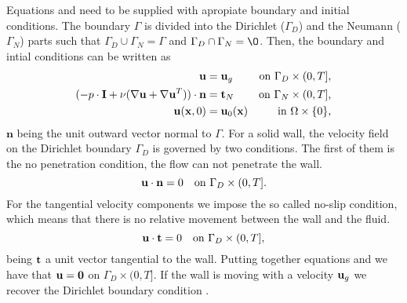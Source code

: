 Equations  and  need to be supplied with apropiate boundary and initial conditions. The boundary $\Gamma$ is divided into the Dirichlet ($\Gamma_D$) and the Neumann ($\Gamma_N$) parts such that $\Gamma_D\cup\Gamma_N=\Gamma$ and $\Gamma_D\cap\Gamma_N=\O$. Then, the boundary and intial conditions can be written as
\begin{align}
\label{eq-NS_strong_Dir}
{\bf u}&={\bf u}_g&\mbox{on $\Gamma_D\times(0,T]$,}\\
\label{eq-NS_strong_Neu}
(-p\cdot\mathbf{I}+\nu(\nabla{\bf u}+\nabla{\bf u}^T))\cdot\mathbf{n}&=\mathbf{t}_N&\mbox{on $\Gamma_N\times(0,T]$,}\\
\label{eq-NS_strong_Ini}
{\bf u}({\bf x},0)&={\bf u}_0({\bf x})&\mbox{in $\Omega\times\{0\}$,}
\end{align}
$\mathbf{n}$ being the unit outward vector normal to $\Gamma$. For a solid wall, the velocity field on the Dirichlet boundary $\Gamma_D$ is governed by two conditions. The first of them is the no penetration condition, the flow can not penetrate the wall.
\begin{equation}
\label{eq-NS_no_penetration}
{\bf u}\cdot{\bf n}=0\quad\mbox{on $\Gamma_D\times(0,T]$}.
\end{equation} 
For the tangential velocity components we impose the so called no-slip condition, which means that there is no relative movement between the wall and the fluid.
\begin{equation}
\label{eq-NS_no_slip}
{\bf u}\cdot{\bf t}=0\quad\mbox{on $\Gamma_D\times(0,T]$},
\end{equation}
being ${\bf t}$ a unit vector tangential to the wall. Putting together equations  and  we have that ${\bf u}=\mathbf{0}$ on $\Gamma_D\times(0,T]$. If the wall is moving with a velocity ${\bf u}_g$ we recover the Dirichlet boundary condition .

